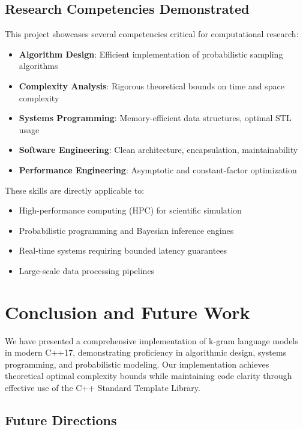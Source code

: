 \documentclass[11pt,letterpaper]{article}
\begin{document}
\subsection{Research Competencies Demonstrated}

This project showcases several competencies critical for computational research:

\begin{itemize}
    \item \textbf{Algorithm Design}: Efficient implementation of probabilistic sampling algorithms
    \item \textbf{Complexity Analysis}: Rigorous theoretical bounds on time and space complexity
    \item \textbf{Systems Programming}: Memory-efficient data structures, optimal STL usage
    \item \textbf{Software Engineering}: Clean architecture, encapsulation, maintainability
    \item \textbf{Performance Engineering}: Asymptotic and constant-factor optimization
\end{itemize}

These skills are directly applicable to:
\begin{itemize}
    \item High-performance computing (HPC) for scientific simulation
    \item Probabilistic programming and Bayesian inference engines
    \item Real-time systems requiring bounded latency guarantees
    \item Large-scale data processing pipelines
\end{itemize}

\section{Conclusion and Future Work}\label{sec:conclusion}

We have presented a comprehensive implementation of k-gram language models in modern C++17, demonstrating proficiency in algorithmic design, systems programming, and probabilistic modeling. Our implementation achieves theoretical optimal complexity bounds while maintaining code clarity through effective use of the C++ Standard Template Library.

\subsection{Future Directions}
\end{document}
